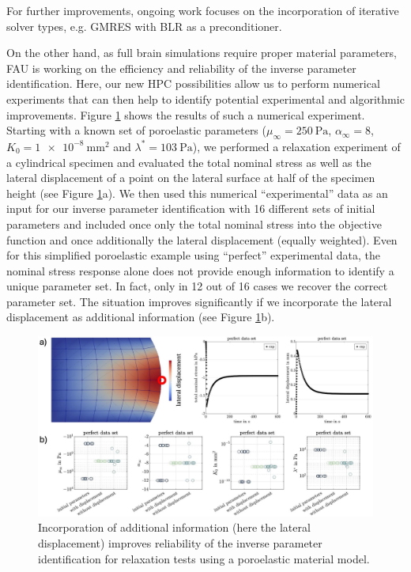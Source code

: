 \documentclass[a4paper,12pt]{article}
\begin{document}
For further improvements, ongoing work focuses on the incorporation of iterative solver types, e.g. GMRES with BLR as a preconditioner.

On the other hand, as full brain simulations require proper material parameters, FAU is working on the efficiency and reliability of the inverse parameter identification. Here, our new HPC possibilities allow us to perform numerical experiments that can then help to identify potential experimental and algorithmic improvements. Figure \ref{fig:fau-inverse-param-identification} shows the results of such a numerical experiment. Starting with a known set of poroelastic parameters ($\mu_\infty = \SI{250}{\pascal}$, $\alpha_\infty = \num{8}$, $K_0 = \SI{1e-8}{\milli\meter\squared}$ and $\lambda^* = \SI{103}{\pascal}$), we performed a relaxation experiment of a cylindrical specimen and evaluated the total nominal stress as well as the lateral displacement of a point on the lateral surface at half of the specimen height (see Figure \ref{fig:fau-inverse-param-identification}a). We then used this numerical ``experimental'' data as an input for our inverse parameter identification with 16 different sets of initial parameters and included once only the total nominal stress into the objective function and once additionally the lateral displacement (equally weighted). Even for this simplified poroelastic example using ``perfect'' experimental data, the nominal stress response alone does not provide enough information to identify a unique parameter set. In fact, only in 12 out of 16 cases we recover the correct parameter set. The situation improves significantly if we incorporate the lateral displacement as additional information (see Figure \ref{fig:fau-inverse-param-identification}b).

\begin{figure}
  \centering

  \includegraphics[width=\textwidth]{fau-inverse-param-identification.jpg}

  \caption{Incorporation of additional information (here the lateral displacement) improves reliability of the inverse parameter identification for relaxation tests using a poroelastic material model.}
  \label{fig:fau-inverse-param-identification}
\end{figure}
\end{document}
